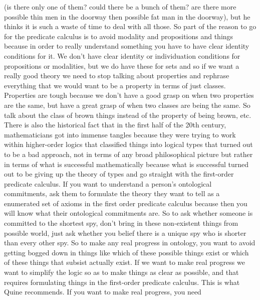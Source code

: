 \documentclass[12pt]{article}
\theoremstyle{definition}
\begin{document}
\begin{enumerate}
        (is there only one of them? could there be a bunch of them? are there
        more possible thin men in the doorway then possible fat man in the
        doorway), but he thinks it is such a waste of time to deal with all
        those. So part of the reason to go for the predicate calculus is to
        avoid modality and propositions and things because in order to really
        understand something you have to have clear identity conditions for it.
        We don't have clear identity  or individuation conditions for
        propositions or modalities, but we do have these for sets and so if we
        want a really good theory we need to stop talking about properties and
        rephrase everything that we would want to be a property in terms of
        just classes. Properties are tough because we don't have a good grasp
        on when two properties are the same, but have a great grasp of when two
        classes are being the same. So talk about the class of brown things
        instead of the property of being brown, etc. There is also the
        historical fact that in the first half of the 20th century,
        mathematicians got into immense tangles because they were trying to
        work within higher-order logics that classified things into logical
        types that turned out to be a bad approach, not in terms of any broad
        philosophical picture but rather in terms of what is successful
        mathematically because what is successful turned out to be giving up
        the theory of types and go straight with the first-order predicate
        calculus. If you want to understand a person's ontological commitments,
        ask them to formulate the theory they want to tell as a enumerated set
        of axioms in the first order predicate calculus because then you will
        know what their ontological commitments are. So to ask whether someone
        is committed to the shortest spy, don't bring in these non-existent
        things from possible world, just ask whether you belief there is a
        unique spy who is shorter than every other spy. So to make any real
        progress in ontology, you want to avoid getting bogged down in things
        like which of these possible things exist or which of these things that
        subsist actually exist. If we want to make real progress we want to
        simplify the logic so as to make things as clear as possible, and that
        requires formulating things in the first-order predicate calculus. This
        is what Quine recommends. If you want to make real progress, you need

\end{enumerate}
\end{document}

